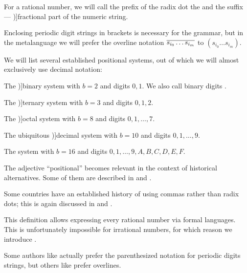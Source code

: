 \begin{definition}
  For a rational number, we will call the prefix of the radix dot the  and the suffix --- \term[en=fractional part (\cite[214]{Knuth1997Vol2})]{fractional part} of the numeric string.

  Enclosing periodic digit strings in brackets is necessary for the grammar, but in the metalanguage we will prefer the overline notation \( \oline{s_{i_0} \ldots s_{i_m}} \) to \( (s_{i_0} \ldots s_{i_m}) \).

  We will list several established positional systems, out of which we will almost exclusively use decimal notation:
  \begin{thmenum}
     The \term[ru=двоичная (система) (\cite[60]{Зорич2019Том1})]{binary} system with \( b = 2 \) and digits \( 0, 1 \). We also call binary digits .

    \mimprovised The \term[ru=троичная (система) (\cite[60]{Зорич2019Том1})]{ternary} system with \( b = 3 \) and digits \( 0, 1, 2 \).

     The \term[ru=восьмичная (система) (\cite[60]{Зорич2019Том1})]{octal} system with \( b = 8 \) and digits \( 0, 1, \ldots, 7 \).

     The ubiquitous \term[ru=десетичная (система) (\cite[60]{Зорич2019Том1})]{decimal} system with \( b = 10 \) and digits \( 0, 1, \ldots, 9 \).

     The  system with \( b = 16 \) and digits \( 0, 1, \ldots, 9, A, B, C, D, E, F \).
  \end{thmenum}
\end{definition}
\begin{comments}
  \item The adjective \enquote{positional} becomes relevant in the context of historical alternatives. Some of them are described in \cite[ch. 1]{ЭнциклопедияЕлементарнойМатематикиТом1} and \cite[sec. 4.1]{Knuth1997Vol2}.

  \item Some countries have an established history of using commas rather than radix dots; this is again discussed in \cite[ch. 1]{ЭнциклопедияЕлементарнойМатематикиТом1} and \cite[sec. 4.1]{Knuth1997Vol2}.

  \item This definition allows expressing every rational number via formal languages. This is unfortunately impossible for irrational numbers, for which reason we introduce .

  \item Some authors like  actually prefer the parenthesized notation for periodic digits strings, but others like  prefer overlines.
\end{comments}

